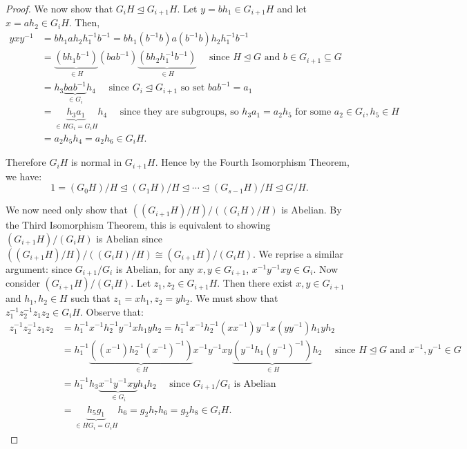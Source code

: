 \documentclass[10pt]{article}
\newcommand{\normsubeq}{\trianglelefteq}
\newcommand\inv{^{-1}}
\begin{document}
\begin{itemize}
\begin{proof}
We now show that $G_iH \normsubeq G_{i+1}H$. Let $y=bh_1 \in
G_{i+1}H$ and let $x=ah_2 \in G_iH$. Then,
\begin{align*}
yxy\inv &=bh_1ah_2h_1\inv b\inv=bh_1(b\inv b)a(b\inv b)h_2h_1\inv b\inv \\
                &= \underbrace{(bh_1b\inv)}_{\in H}(bab\inv)\underbrace{(bh_2h_1\inv b\inv)}_{\in H} \quad \text{ since $H \normsubeq G$ and }b \in G_{i+1} \subseteq G \\
                &=h_3\underbrace{bab\inv}_{\in G_i}h_4 \quad \text{ since } G_i \normsubeq G_{i+1} \text{ so set } bab\inv=a_1\\
                &=\underbrace{h_3a_1}_{\in HG_i=G_iH}h_4 \quad \text{ since they are subgroups, so }h_3a_1=a_2h_5 \text{ for some }a_2 \in G_i, h_5 \in H \\
                &=a_2h_5h_4=a_2h_6 \in G_iH.
\end{align*}

Therefore $G_iH$ is normal in $G_{i+1}H$. Hence by the Fourth
Isomorphism Theorem, we have:
\begin{equation*}
1=(G_0H)/H \normsubeq (G_1H)/H \normsubeq \cdots \normsubeq
(G_{s-1}H)/H \normsubeq G/H.
\end{equation*}

We now need only show that
$\left((G_{i+1}H)/H\right)/\left((G_iH)/H\right)$ is Abelian. By the
Third Isomorphism Theorem, this is equivalent to showing
$(G_{i+1}H)/(G_iH)$ is Abelian since
$\left((G_{i+1}H)/H\right)/\left((G_iH)/H\right)\cong
(G_{i+1}H)/(G_iH)$. We reprise a similar argument: since
$G_{i+1}/G_i$ is Abelian, for any $x,y \in G_{i+1}$, $x\inv y \inv
xy \in G_i$. Now consider $(G_{i+1}H)/(G_iH)$. Let $z_1, z_2 \in
G_{i+1}H$. Then there exist $x,y \in G_{i+1}$ and $h_1,h_2 \in H$
such that $z_1=xh_1, z_2=yh_2$. We must show that $z_1\inv z_2\inv
z_1z_2 \in G_iH$. Observe that:
\begin{align*}
z_1\inv z_2\inv z_1z_2 &= h_1\inv x\inv h_2\inv y\inv xh_1yh_2 = h_1\inv x\inv h_2\inv(xx\inv) y\inv x(yy\inv)h_1yh_2 \\
                       &= h_1\inv\underbrace{((x\inv)h_2\inv(x\inv)\inv)}_{\in H}x\inv y\inv xy \underbrace{(y\inv h_1(y\inv)\inv)}_{\in H}h_2 \quad \text{ since }H \normsubeq G \text{ and } x\inv,y\inv \in G \\
                       &=h_1\inv h_3\underbrace{x\inv y\inv xy}_{\in G_i}h_4h_2 \quad \text{ since $G_{i+1}/G_i$ is Abelian} \\
                       &=\underbrace{h_5g_1}_{\in HG_i=G_iH}h_6=g_2h_7h_6=g_2h_8 \in G_iH.
\end{align*}


\end{proof}
\end{itemize}
\end{document}
